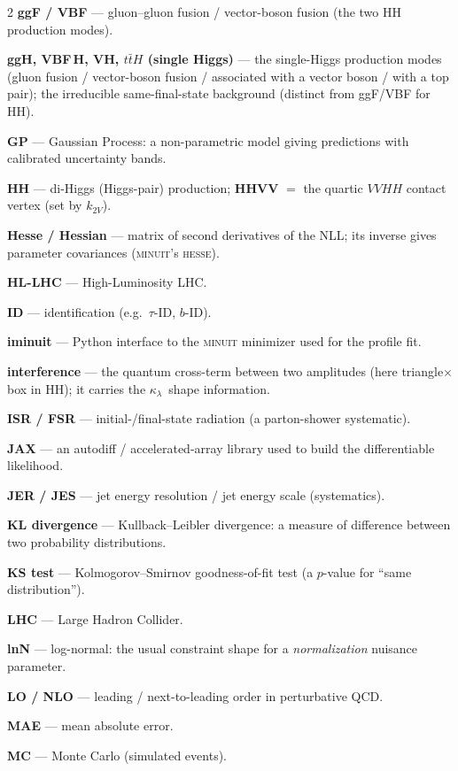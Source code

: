 \documentclass[11pt]{article}
\newcommand{\kl}{\ensuremath{\kappa_\lambda}}
\begin{document}
{\begin{multicols}{2}
\textbf{ggF / VBF} --- gluon--gluon fusion / vector-boson fusion (the two HH production modes).

\textbf{ggH, VBF\,H, VH, $t\bar tH$ (single Higgs)} --- the single-Higgs production modes (gluon fusion / vector-boson fusion / associated with a vector boson / with a top pair); the irreducible same-final-state background (distinct from ggF/VBF for HH).

\textbf{GP} --- Gaussian Process: a non-parametric model giving predictions with calibrated uncertainty bands.

\textbf{HH} --- di-Higgs (Higgs-pair) production; \textbf{HHVV} $=$ the quartic $VVHH$ contact vertex (set by $k_{2V}$).

\textbf{Hesse / Hessian} --- matrix of second derivatives of the NLL; its inverse gives parameter covariances (\textsc{minuit}'s \textsc{hesse}).

\textbf{HL-LHC} --- High-Luminosity LHC.

\textbf{ID} --- identification (e.g.\ $\tau$-ID, $b$-ID).

\textbf{iminuit} --- Python interface to the \textsc{minuit} minimizer used for the profile fit.

\textbf{interference} --- the quantum cross-term between two amplitudes (here triangle$\times$box in HH); it carries the \kl\ shape information.

\textbf{ISR / FSR} --- initial-/final-state radiation (a parton-shower systematic).

\textbf{JAX} --- an autodiff / accelerated-array library used to build the differentiable likelihood.

\textbf{JER / JES} --- jet energy resolution / jet energy scale (systematics).

\textbf{KL divergence} --- Kullback--Leibler divergence: a measure of difference between two probability distributions.

\textbf{KS test} --- Kolmogorov--Smirnov goodness-of-fit test (a $p$-value for ``same distribution'').

\textbf{LHC} --- Large Hadron Collider.

\textbf{lnN} --- log-normal: the usual constraint shape for a \emph{normalization} nuisance parameter.

\textbf{LO / NLO} --- leading / next-to-leading order in perturbative QCD.

\textbf{MAE} --- mean absolute error.

\textbf{MC} --- Monte Carlo (simulated events).


\end{multicols}}
\end{document}
